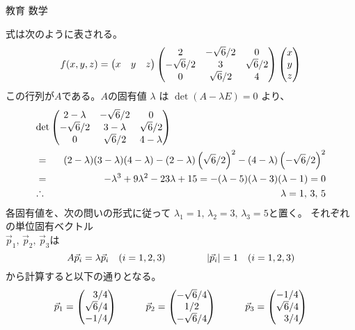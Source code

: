 \documentclass[fleqn]{jbook}
\begin{document}
\begin{answer}{教育 数学}{}

\def\vr{\vec{r}\,}

\def\vectT#1#2#3{\begin{pmatrix}#1&#2&#3\end{pmatrix}}

\begin{subanswers}
\SubAnswer

  \begin{subsubanswers}
  \SubSubAnswer
    式は次のように表される。
%
    \[ f(x,y,z)=%
       \vectT{x}{y}{z}
       \begin{pmatrix}
         2          & -\sqrt{6}/2 & 0          \\
        -\sqrt{6}/2 & 3           & \sqrt{6}/2 \\
         0          & \sqrt{6}/2  & 4          \end{pmatrix}
       \vect{x}{y}{z} \]
%
    この行列が$A$である。$A$の固有値
    $\lambda$ は $\det(A-\lambda E)=0 $ より、
%
    \begin{eqnarray*}
      \lefteqn{\det \begin{pmatrix}%
         2-\lambda  & -\sqrt{6}/2 & 0          \\
        -\sqrt{6}/2 & 3-\lambda   & \sqrt{6}/2 \\
         0          & \sqrt{6}/2  & 4-\lambda  \end{pmatrix}}\\
       &=&  (2-\lambda)(3-\lambda)(4-\lambda)%
           -(2-\lambda)\left( \sqrt{6}/2\right)^2%
           -(4-\lambda)\left(-\sqrt{6}/2\right)^2 \\
       &=& -\lambda^3 + 9\lambda^2 - 23\lambda + 15%
        =  -(\lambda-5)(\lambda-3)(\lambda-1)%
        =  0 \\
       &\Yueni& \lambda=1,\,3,\,5
    \end{eqnarray*}
%
    各固有値を、次の問いの形式に従って
    $\lambda_1=1,\,\lambda_2=3,\,\lambda_3=5$と置く。
    それぞれの単位固有ベクトル\\
    $\vec{p}_1,\,\vec{p}_2,\,\vec{p}_3$は
%
    \[ A\vec{p}_i=\lambda \vec{p}_i  \quad (i=1,2,3) \hspace{15mm}%
       |\vec{p}_i|=1  \quad (i=1,2,3) \]
%
    から計算すると以下の通りとなる。
%
    \[ \vec{p}_1 = \vect{\hfill 3/4}{\sqrt{6}/4}{-1/4}%
       \hskip 0.4 in%
       \vec{p}_2 = \vect{-\sqrt{6}/4}{1/2}{-\sqrt{6}/4}%
       \hskip 0.4 in%
       \vec{p}_3 = \vect{-1/4}{\sqrt{6}/4}{\hfill 3/4} \]
%


\end{subsubanswers}
\end{subanswers}
\end{answer}
\end{document}
